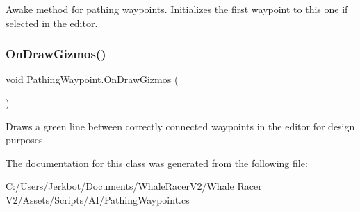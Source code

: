 Awake method for pathing waypoints. Initializes the first waypoint to this one if selected in the editor. 

\mbox{\label{class_pathing_waypoint_a65bdda3cb83eb83737a14545032c29d9}} 
\subsubsection{\texorpdfstring{On\+Draw\+Gizmos()}{OnDrawGizmos()}}
{\footnotesize\ttfamily void Pathing\+Waypoint.\+On\+Draw\+Gizmos (\begin{DoxyParamCaption}{ }\end{DoxyParamCaption})\hspace{0.3cm}{\ttfamily [private]}}



Draws a green line between correctly connected waypoints in the editor for design purposes. 



The documentation for this class was generated from the following file\+:\begin{DoxyCompactItemize}
\item 
C\+:/\+Users/\+Jerkbot/\+Documents/\+Whale\+Racer\+V2/\+Whale Racer V2/\+Assets/\+Scripts/\+A\+I/Pathing\+Waypoint.\+cs\end{DoxyCompactItemize}
